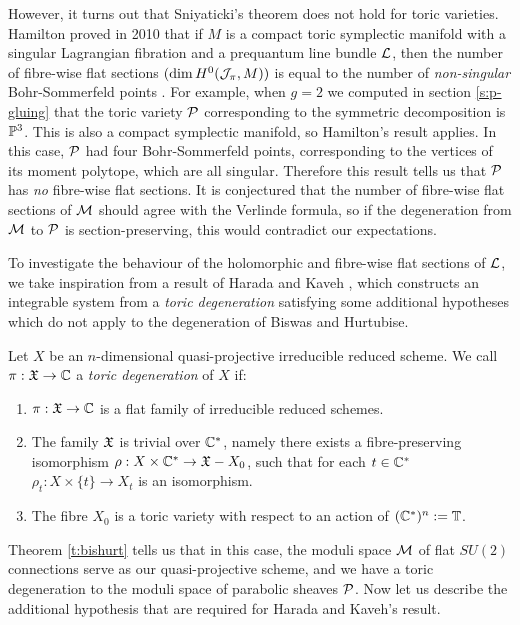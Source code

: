 	However, it turns out that Sniyaticki's theorem does not hold for toric varieties. Hamilton proved in 2010 that if $M$ is a compact toric symplectic manifold with a singular Lagrangian fibration and a prequantum line bundle $\mathcal{L}$, then the number of fibre-wise flat sections $(\dim H^0(\mathcal{J}_{\pi}, M))$ is equal to the number of \emph{non-singular} Bohr-Sommerfeld points \cite[Theorem 8.3.2]{hamilton_locally_2010}. For example, when $g=2$ we computed in section \ref{s:p-gluing} that the toric variety $\mathcal{P}$ corresponding to the symmetric decomposition is $\mathbb{P}^3$. This is also a compact symplectic manifold, so Hamilton's result applies. In this case, $\mathcal{P}$ had four Bohr-Sommerfeld points, corresponding to the vertices of its moment polytope, which are all singular. Therefore this result tells us that $\mathcal{P}$ has \emph{no} fibre-wise flat sections. It is conjectured that the number of fibre-wise flat sections of $\mathcal{M}$ should agree with the Verlinde formula, so if the degeneration from $\mathcal{M}$ to $\mathcal{P}$ is section-preserving, this would contradict our expectations.
	
	To investigate the behaviour of the holomorphic and fibre-wise flat sections of $\mathcal{L}$, we take inspiration from a result of Harada and Kaveh \cite{harada_integrable_2015}, which constructs an integrable system from a \textit{toric degeneration} satisfying some additional hypotheses which do not apply to the degeneration of Biswas and Hurtubise. 
	\begin{definition}
		\label{d:toricdegen}
		Let $X$ be an $n$-dimensional quasi-projective irreducible reduced scheme. We call $\pi: \mathfrak{X}\to\mathbb{C}$ a \emph{toric degeneration} of $X$ if:
		\begin{enumerate}
			\item $\pi:\mathfrak{X}\to\mathbb{C}$ is a flat family of irreducible reduced schemes.
			\item The family $\mathfrak{X}$ is trivial over $\mathbb{C}^\ast$, namely there exists a fibre-preserving isomorphism $\rho:X\times\mathbb{C}^\ast \to \mathfrak{X} - X_0$, such that for each $t\in \mathbb{C}^\ast$ $\rho_t:X\times\{t\} \to X_t$ is an isomorphism.
			\item The fibre $X_0$ is a toric variety with respect to an action of $(\mathbb{C}^\ast)^n := \mathbb{T}$.
		\end{enumerate}
	\end{definition}
	Theorem \ref{t:bishurt} tells us that in this case, the moduli space $\mathcal{M}$ of flat $SU(2)$ connections serve as our quasi-projective scheme, and we have a toric degeneration to the moduli space of parabolic sheaves $\mathcal{P}$. Now let us describe the additional hypothesis that are required for Harada and Kaveh's result.
	
